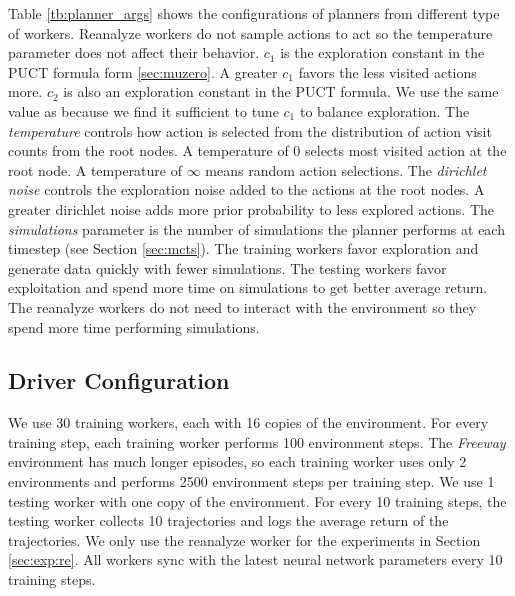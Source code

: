Table \ref{tb:planner_args} shows the configurations of planners from different type of workers.
Reanalyze workers do not sample actions to act so the temperature parameter does not affect their behavior.
$c_1$ is the exploration constant in the PUCT formula form \ref{sec:muzero}.
A greater $c_1$ favors the less visited actions more.
$c_2$ is also an exploration constant in the PUCT formula.
We use the same value as \cite{MasteringAtariGo_Schrittwieser.Antonoglou.ea_2020} because we find it sufficient to tune $c_1$ to balance exploration.
The \textit{temperature} controls how action is selected from the distribution of action visit counts from the root nodes.
A temperature of 0 selects most visited action at the root node.
A temperature of $\infty$ means random action selections.
The \textit{dirichlet noise} controls the exploration noise added to the actions at the root nodes.
A greater dirichlet noise adds more prior probability to less explored actions.
The \textit{simulations} parameter is the number of simulations the planner performs at each timestep (see Section \ref{sec:mcts}).
The training workers favor exploration and generate data quickly with fewer simulations.
The testing workers favor exploitation and spend more time on simulations to get better average return.
The reanalyze workers do not need to interact with the environment so they spend more time performing simulations.

\subsection{Driver Configuration} \label{sec:exp:driver}
We use 30 training workers, each with 16 copies of the environment.
For every training step, each training worker performs 100 environment steps.
The \textit{Freeway} environment has much longer episodes, so each training worker uses only 2 environments and performs 2500 environment steps per training step.
We use 1 testing worker with one copy of the environment.
For every 10 training steps, the testing worker collects 10 trajectories and logs the average return of the trajectories.
We only use the reanalyze worker for the experiments in Section \ref{sec:exp:re}.
All workers sync with the latest neural network parameters every 10 training steps.



